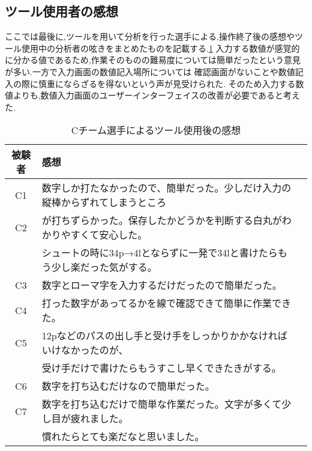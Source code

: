 \documentclass[../main.tex]{subfiles}
\begin{document}
  \subsection{ツール使用者の感想}
ここでは最後に,ツールを用いて分析を行った選手による,操作終了後の感想やツール使用中の分析者の呟きをまとめたものを記載する.\ref{table:高校生のツール使用者の感想}
入力する数値が感覚的に分かる値であるため,作業そのものの難易度については簡単だったという意見が多い.一方で入力画面の数値記入場所については
確認画面がないことや数値記入の際に慎重にならざるを得ないという声が見受けられた.
そのため入力する数値よりも,数値入力画面のユーザーインターフェイスの改善が必要であると考えた.


\begin{table}[h]
  \caption{Cチーム選手によるツール使用後の感想}\label{table:高校生のツール使用者の感想}\centering
  \centering
  \begin{tabular}{cll}
    \hline \hline
    被験者 & 感想 \\
    \hline \hline
    C1 & 数字しか打たなかったので、簡単だった。少しだけ入力の縦棒からずれてしまうところ \\
    C2 & が打ちずらかった。保存したかどうかを判断する白丸がわかりやすくて安心した。\\
    & シュートの時に34p→4lとならずに一発で34lと書けたらもう少し楽だった気がする。 \\
    C3 & 数字とローマ字を入力するだけだったので簡単だった。 \\
    C4 & 打った数字があってるかを線で確認できて簡単に作業できた。 \\
    C5 & 12pなどのパスの出し手と受け手をしっかりかかなければいけなかったのが、\\
    & 受け手だけで書けたらもうすこし早くできたきがする。\\
    C6 & 数字を打ち込むだけなので簡単だった。 \\
    C7 & 数字を打ち込むだけで簡単な作業だった。文字が多くて少し目が疲れました。\\
    & 慣れたらとても楽だなと思いました。 \\
    \hline
  \end{tabular}
\end{table}
\end{document}

